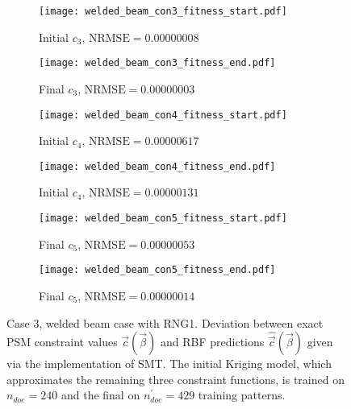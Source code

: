 \begin{figure}[h!]
\centering
    \begin{subfigure}[b]{0.45\textwidth}
    \centering
    \caption{Initial $c_{3}$, $\mathrm{NRMSE} \!= \!0.00000008$}
    \texttt{[image: welded\_beam\_con3\_fitness\_start.pdf]}    
    \end{subfigure}
    \hfill
    \begin{subfigure}[b]{0.45\textwidth}
    \centering
    \caption{Final $c_{3}$, $\mathrm{NRMSE} \!= \!0.00000003$}
    \texttt{[image: welded\_beam\_con3\_fitness\_end.pdf]}    
    \end{subfigure}
    \hfill
    \begin{subfigure}[b]{0.45\textwidth}
    \centering
    \caption{Initial $c_{4}$, $\mathrm{NRMSE} \!= \!0.00000617$}
    \texttt{[image: welded\_beam\_con4\_fitness\_start.pdf]}    
    \end{subfigure}
    \hfill
    \begin{subfigure}[b]{0.45\textwidth}
    \centering
    \caption{Initial $c_{4}$, $\mathrm{NRMSE} \!= \!0.00000131$}
    \texttt{[image: welded\_beam\_con4\_fitness\_end.pdf]}   
    \end{subfigure}
    \hfill
    \begin{subfigure}[b]{0.45\textwidth}
    \centering
    \caption{Final $c_{5}$, $\mathrm{NRMSE} \!= \!0.00000053$}
    \texttt{[image: welded\_beam\_con5\_fitness\_start.pdf]}   
    \end{subfigure} 
    \hfill
    \begin{subfigure}[b]{0.45\textwidth}
    \centering
    \caption{Final $c_{5}$, $\mathrm{NRMSE} \!= \!0.00000014$}
    \texttt{[image: welded\_beam\_con5\_fitness\_end.pdf]}    
    \end{subfigure}
\caption{Case 3, welded beam case with RNG1. Deviation between 
exact PSM constraint values $\vec{c}(\vec{β})$ and RBF predictions 
$\hat{\vec{c}}(\vec{β})$ given via the implementation of SMT. The 
initial Kriging model, which approximates the remaining three 
constraint functions, is trained on $n_{doe} \!= \!240$ and the 
final on $n_{doe}^{'} \!= \!429$ training patterns.}
\label{fig:fitting_con3_5_welded_beam}
\end{figure}

